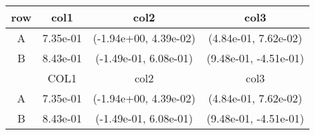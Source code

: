 \begin{tabular}{cccc}
\toprule
row&col1&col2&col3\tabularnewline
\midrule
A&7.35e-01& (-1.94e+00, 4.39e-02)& (4.84e-01, 7.62e-02)\tabularnewline
B&8.43e-01& (-1.49e-01, 6.08e-01)& (9.48e-01, -4.51e-01)\tabularnewline
\midrule
&COL1&col2&col3\tabularnewline
\midrule
A&7.35e-01& (-1.94e+00, 4.39e-02)& (4.84e-01, 7.62e-02)\tabularnewline
B&8.43e-01& (-1.49e-01, 6.08e-01)& (9.48e-01, -4.51e-01)\tabularnewline
\bottomrule
\end{tabular}
